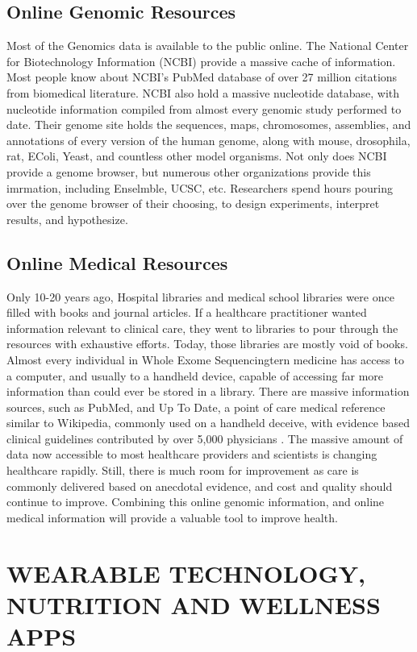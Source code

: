 \documentclass[sigconf]{acmart}
\begin{document}
\subsection{Online Genomic Resources}
Most of the Genomics data is available to the public online. The National Center for Biotechnology Information (NCBI)  provide a massive cache of information.  Most people know about NCBI's PubMed database of over 27 million citations from biomedical literature.  NCBI also hold  a massive nucleotide database, with nucleotide information compiled from almost every genomic study performed to date.  Their genome site holds the sequences, maps, chromosomes, assemblies, and annotations of every version of the human genome, along with mouse, drosophila, rat, EColi, Yeast, and countless other model organisms.   Not only does NCBI provide a genome browser, but numerous other organizations provide this imrmation, including Enselmble, UCSC, etc.  Researchers spend hours pouring over the genome browser of their choosing,  to design experiments, interpret results, and hypothesize.    

\subsection{Online Medical Resources}
Only 10-20 years ago, Hospital libraries and medical school libraries
were once filled with books and journal articles.  If a healthcare
practitioner wanted information relevant to clinical care, they went
to libraries to pour through the resources with exhaustive efforts.
Today, those libraries are mostly void of books.  Almost every
individual in Whole Exome Sequencingtern medicine has access to a computer, and usually
to a handheld device, capable of accessing far more information than
could ever be stored in a library.  There are massive information
sources, such as PubMed, and Up
To Date, a point of care medical reference similar to Wikipedia, commonly used on a handheld
deceive, with evidence based clinical guidelines contributed by over
5,000 physicians \cite{wiki-uptodate}. The massive amount of data now
accessible to most healthcare providers and scientists is changing
healthcare rapidly.  Still, there is much room for improvement as care
is commonly delivered based on anecdotal evidence, and cost and
quality should continue to improve.  Combining this online genomic information, and online medical information will provide a valuable tool to improve health.  

\section{WEARABLE TECHNOLOGY, NUTRITION AND WELLNESS APPS}
\end{document}
